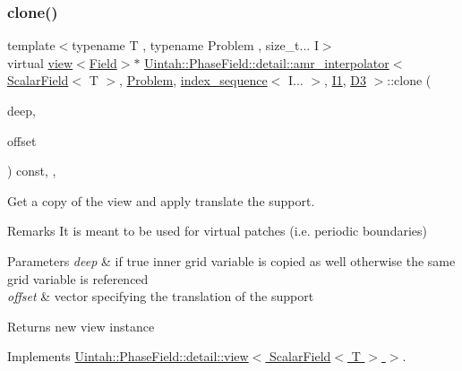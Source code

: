 \subsubsection{\texorpdfstring{clone()}{clone()}\hspace{0.1cm}{\footnotesize\ttfamily [2/2]}}
{\footnotesize\ttfamily template$<$typename T , typename Problem , size\+\_\+t... I$>$ \\
virtual \hyperlink{classUintah_1_1PhaseField_1_1detail_1_1view}{view}$<$\hyperlink{structUintah_1_1PhaseField_1_1ScalarField}{Field}$>$$\ast$ \hyperlink{classUintah_1_1PhaseField_1_1detail_1_1amr__interpolator}{Uintah\+::\+Phase\+Field\+::detail\+::amr\+\_\+interpolator}$<$ \hyperlink{structUintah_1_1PhaseField_1_1ScalarField}{Scalar\+Field}$<$ T $>$, \hyperlink{classUintah_1_1PhaseField_1_1Problem}{Problem}, \hyperlink{namespaceUintah_1_1PhaseField_a237de804d99512e50613aff7c94a9461}{index\+\_\+sequence}$<$ I... $>$, \hyperlink{namespaceUintah_1_1PhaseField_a547ce3002aa97fbd3ef3192a6eec8406a66f19efe774b0d2b6e5844eb2d83d305}{I1}, \hyperlink{namespaceUintah_1_1PhaseField_a12bfc68444894dffdf0cb8d9cf0cc76aa72fd61934c7ca788c49ad90629f76e78}{D3} $>$\+::clone (\begin{DoxyParamCaption}\item[{bool}]{deep,  }\item[{const Int\+Vector \&}]{offset }\end{DoxyParamCaption}) const\hspace{0.3cm}{\ttfamily [inline]}, {\ttfamily [override]}, {\ttfamily [virtual]}}



Get a copy of the view and apply translate the support. 

\begin{DoxyRemark}{Remarks}
It is meant to be used for virtual patches (i.\+e. periodic boundaries)
\end{DoxyRemark}

\begin{DoxyParams}{Parameters}
{\em deep} & if true inner grid variable is copied as well otherwise the same grid variable is referenced \\
\hline
{\em offset} & vector specifying the translation of the support \\
\hline
\end{DoxyParams}
\begin{DoxyReturn}{Returns}
new view instance 
\end{DoxyReturn}


Implements \hyperlink{classUintah_1_1PhaseField_1_1detail_1_1view_3_01ScalarField_3_01T_01_4_01_4_abd928104240e329f3bc4441ebab7c50c}{Uintah\+::\+Phase\+Field\+::detail\+::view$<$ Scalar\+Field$<$ T $>$ $>$}.

